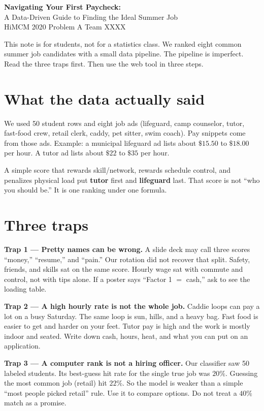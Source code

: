 \documentclass[11pt]{article}
\begin{document}
\begin{center}
{\Large\bfseries Navigating Your First Paycheck:}\\[0.2em]
{\large A Data-Driven Guide to Finding the Ideal Summer Job}\\[0.4em]
{\small HiMCM 2020 Problem A \quad Team XXXX}
\end{center}

\medskip
\noindent
This note is for students, not for a statistics class.
We ranked eight common summer job candidates with a small data pipeline.
The pipeline is imperfect.
Read the three traps first.
Then use the web tool in three steps.

\section*{What the data actually said}

We used 50 student rows and eight job ads (lifeguard, camp counselor, tutor, fast-food crew, retail clerk, caddy, pet sitter, swim coach).
Pay snippets come from those ads.
Example: a municipal lifeguard ad lists about \(\$15.50\) to \(\$18.00\) per hour.
A tutor ad lists about \(\$22\) to \(\$35\) per hour.

A simple score that rewards skill/network, rewards schedule control, and penalizes physical load put \textbf{tutor} first and \textbf{lifeguard} last.
That score is not ``who you should be.''
It is one ranking under one formula.

\section*{Three traps}

\textbf{Trap 1 --- Pretty names can be wrong.}
A slide deck may call three scores ``money,'' ``resume,'' and ``pain.''
Our rotation did not recover that split.
Safety, friends, and skills sat on the same score.
Hourly wage sat with commute and control, not with tips alone.
If a poster says ``Factor 1 \(=\) cash,'' ask to see the loading table.

\textbf{Trap 2 --- A high hourly rate is not the whole job.}
Caddie loops can pay a lot on a busy Saturday.
The same loop is sun, hills, and a heavy bag.
Fast food is easier to get and harder on your feet.
Tutor pay is high and the work is mostly indoor and seated.
Write down cash, hours, heat, and what you can put on an application.

\textbf{Trap 3 --- A computer rank is not a hiring officer.}
Our classifier saw 50 labeled students.
Its best-guess hit rate for the single true job was \(20\%\).
Guessing the most common job (retail) hit \(22\%\).
So the model is weaker than a simple ``most people picked retail'' rule.
Use it to compare options.
Do not treat a \(40\%\) match as a promise.
\end{document}
